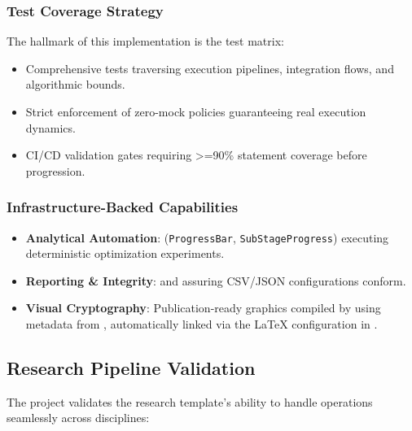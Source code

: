 \documentclass[
]{article}
\providecommand{\tightlist}{%
  \setlength{\itemsep}{0pt}\setlength{\parskip}{0pt}}
\begin{document}
\subsubsection{Test Coverage Strategy}\label{test-coverage-strategy}

The hallmark of this implementation is the test matrix:

\begin{itemize}
\tightlist
\item
  Comprehensive tests traversing execution pipelines, integration flows,
  and algorithmic bounds.
\item
  Strict enforcement of zero-mock policies guaranteeing real execution
  dynamics.
\item
  CI/CD validation gates requiring \texorpdfstring{\textgreater{}=}{>=}90\% statement coverage before
  progression.
\end{itemize}

\subsubsection{Infrastructure-Backed
Capabilities}\label{infrastructure-backed-capabilities}

\begin{itemize}
\tightlist
\item
  \textbf{Analytical Automation}: 
  (\texttt{ProgressBar}, \texttt{SubStageProgress}) executing
  deterministic optimization experiments.
\item
  \textbf{Reporting \& Integrity}:
   and
   assuring CSV/JSON
  configurations conform.
\item
  \textbf{Visual Cryptography}: Publication-ready graphics compiled by
   using metadata from
  ,
  automatically linked via the LaTeX configuration in
  .
\end{itemize}

\subsection{Research Pipeline
Validation}\label{research-pipeline-validation}

The project validates the research template's ability to handle
operations seamlessly across disciplines:
\end{document}
